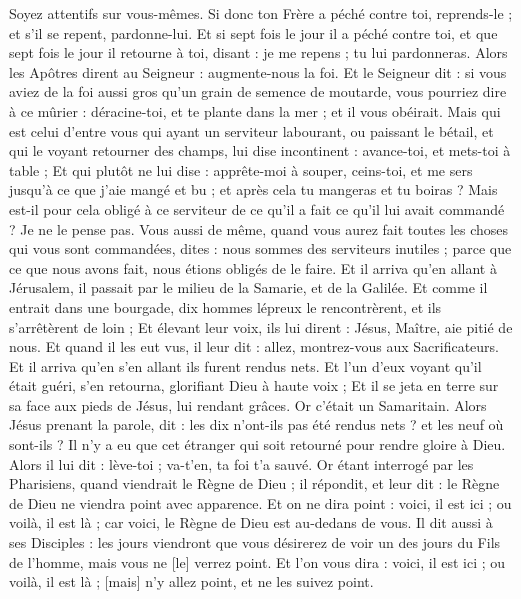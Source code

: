 \begin{multicols}{2}
Soyez attentifs sur vous-mêmes. Si donc ton Frère a péché contre toi, reprends-le ; et s'il se repent, pardonne-lui.
Et si sept fois le jour il a péché contre toi, et que sept fois le jour il retourne à toi, disant : je me repens ; tu lui pardonneras.
Alors les Apôtres dirent au Seigneur : augmente-nous la foi.
Et le Seigneur dit : si vous aviez de la foi aussi gros qu'un grain de semence de moutarde, vous pourriez dire à ce mûrier : déracine-toi, et te plante dans la mer ; et il vous obéirait.
Mais qui est celui d'entre vous qui ayant un serviteur labourant, ou paissant le bétail, et qui le voyant retourner des champs, lui dise incontinent : avance-toi, et mets-toi à table ;
Et qui plutôt ne lui dise : apprête-moi à souper, ceins-toi, et me sers jusqu'à ce que j'aie mangé et bu ; et après cela tu mangeras et tu boiras ?
Mais est-il pour cela obligé à ce serviteur de ce qu'il a fait ce qu'il lui avait commandé ? Je ne le pense pas.
Vous aussi de même, quand vous aurez fait toutes les choses qui vous sont commandées, dites : nous sommes des serviteurs inutiles ; parce que ce que nous avons fait, nous étions obligés de le faire.
Et il arriva qu'en allant à Jérusalem, il passait par le milieu de la Samarie, et de la Galilée.
Et comme il entrait dans une bourgade, dix hommes lépreux le rencontrèrent, et ils s'arrêtèrent de loin ;
Et élevant leur voix, ils lui dirent : Jésus, Maître, aie pitié de nous.
Et quand il les eut vus, il leur dit : allez, montrez-vous aux Sacrificateurs. Et il arriva qu'en s'en allant ils furent rendus nets.
Et l'un d'eux voyant qu'il était guéri, s'en retourna, glorifiant Dieu à haute voix ;
Et il se jeta en terre sur sa face aux pieds de Jésus, lui rendant grâces. Or c'était un Samaritain.
Alors Jésus prenant la parole, dit : les dix n'ont-ils pas été rendus nets ? et les neuf où sont-ils ?
Il n'y a eu que cet étranger qui soit retourné pour rendre gloire à Dieu.
Alors il lui dit : lève-toi ; va-t'en, ta foi t'a sauvé.
Or étant interrogé par les Pharisiens, quand viendrait le Règne de Dieu ; il répondit, et leur dit : le Règne de Dieu ne viendra point avec apparence.
Et on ne dira point : voici, il est ici ; ou voilà, il est là ; car voici, le Règne de Dieu est au-dedans de vous.
Il dit aussi à ses Disciples : les jours viendront que vous désirerez de voir un des jours du Fils de l'homme, mais vous ne [le] verrez point.
Et l'on vous dira : voici, il est ici ; ou voilà, il est là ; [mais] n'y allez point, et ne les suivez point.

\end{multicols}

